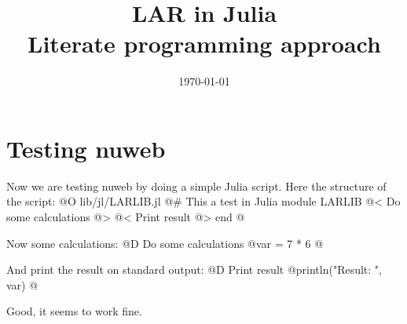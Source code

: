 \documentclass[11pt]{book}
\title{LAR in Julia \\ \small Literate programming approach}
\date{\today}
\begin{document}
\maketitle
\newpage

\section{Testing nuweb}
Now we are testing nuweb by doing a simple Julia script. Here the structure of the script:
@O lib/jl/LARLIB.jl
@{# This a test in Julia
module LARLIB
@< Do some calculations @>
@< Print result @>
end
@}

Now some calculations:
@D Do some calculations
@{var = 7 * 6
@}

And print the result on standard output:
@D Print result
@{println("Result: ", var)
@}

Good, it seems to work fine.
\end{document}
